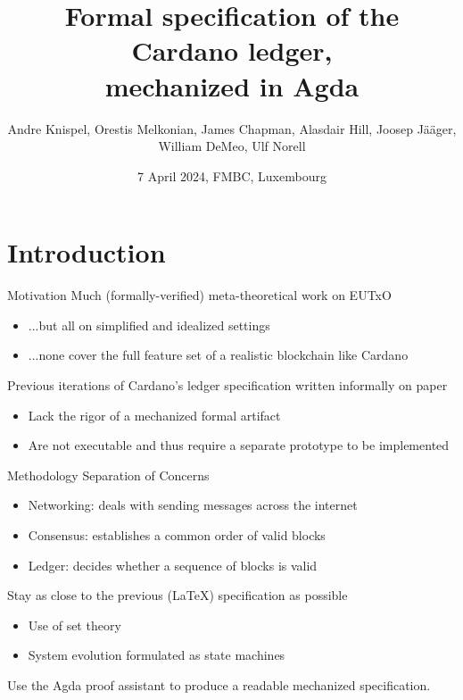 \documentclass[aspectratio=169]{beamer}
\title{%
Formal specification of the Cardano ledger,\\
mechanized in Agda}
\author{\footnotesize Andre Knispel, \alert{Orestis Melkonian}, James Chapman,
Alasdair Hill, Joosep Jääger, William DeMeo, Ulf Norell\\}
\date{7 April 2024, FMBC, Luxembourg}
\renewcommand\alert[1]{\textcolor{mLightBrown}{#1}}
\begin{document}
\AgdaNoSpaceAroundCode{}



\begin{center}
\maketitle
\end{center}














\section{Introduction}
\begin{frame}{Motivation}
Much (formally-verified) meta-theoretical work on EUTxO
  \begin{itemize}
  \item ...but all on simplified and idealized settings
  \item ...none cover the full feature set of a realistic blockchain like Cardano
  \end{itemize}
\pause
Previous iterations of Cardano's ledger specification written informally on paper
  \begin{itemize}
  \item Lack the rigor of a mechanized formal artifact
  \item Are not executable and thus require a separate prototype to be implemented
  \end{itemize}
\end{frame}
\begin{frame}{Methodology}
Separation of Concerns
\begin{itemize}
\item Networking: deals with sending messages across the internet
\item Consensus: establishes a common order of valid blocks
\item \alert{Ledger}: decides whether a sequence of blocks is valid
\end{itemize}

\pause
Stay as close to the previous (LaTeX) specification as possible
\begin{itemize}
\item Use of \alert{set theory}
\item System evolution formulated as \alert{state machines}
\end{itemize}

\pause
Use the Agda proof assistant to produce a
\alert{readable} mechanized specification.
\end{frame}
\end{document}
